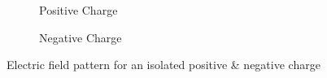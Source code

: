 \begin{figure}[htbp]
  \centering
  \begin{subfigure}[t]{0.3\textwidth}
      \caption{Positive Charge}
      \label{fig:11.4a}
  \end{subfigure}
  \begin{subfigure}[t]{0.3\textwidth}
      \caption{Negative Charge}
      \label{fig:11.4b}
  \end{subfigure}
  \caption[]{Electric field pattern for an isolated positive \& negative charge}
  \label{fig:11.4}
\end{figure}

